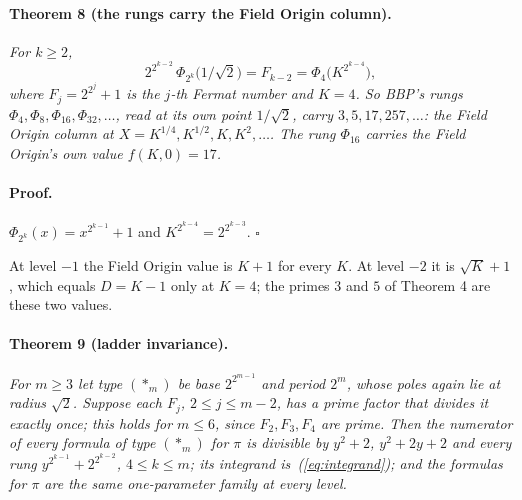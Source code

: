 \documentclass[twocolumn]{iopjournal}
\begin{document}
\paragraph{Theorem 8 (the rungs carry the Field Origin column).}
\textit{For $k \ge 2$,}
\begin{equation}
  2^{2^{k-2}}\,\Phi_{2^k}\!\big(1/\sqrt2\big) = F_{k-2}
  = \Phi_4\big(K^{2^{k-4}}\big),
\end{equation}
\textit{where $F_j = 2^{2^j} + 1$ is the $j$-th Fermat number and
$K = 4$. So BBP's rungs $\Phi_4, \Phi_8, \Phi_{16}, \Phi_{32}, \dots$,
read at its own point $1/\sqrt2$, carry $3, 5, 17, 257, \dots$: the
Field Origin column at $X = K^{1/4}, K^{1/2}, K, K^2, \dots$. The rung
$\Phi_{16}$ carries the Field Origin's own value $f(K,0) = 17$.}

\paragraph{Proof.} $\Phi_{2^k}(x) = x^{2^{k-1}} + 1$ and
$K^{2^{k-4}} = 2^{2^{k-3}}$. \hfill $\square$

\medskip
\noindent
At level $-1$ the Field Origin value is $K + 1$ for every $K$. At
level $-2$ it is $\sqrt K + 1$, which equals $D = K - 1$ only at
$K = 4$; the primes $3$ and $5$ of Theorem 4 are these two values.

\paragraph{Theorem 9 (ladder invariance).} \textit{For $m \ge 3$ let
type $(\ast_m)$ be base $2^{2^{m-1}}$ and period $2^m$, whose poles
again lie at radius $\sqrt2$. Suppose each $F_j$, $2 \le j \le m-2$,
has a prime factor that divides it exactly once; this holds for
$m \le 6$, since $F_2, F_3, F_4$ are prime. Then the numerator of every
formula of type $(\ast_m)$ for $\pi$ is divisible by $y^2 + 2$,
$y^2 + 2y + 2$ and every rung $y^{2^{k-1}} + 2^{2^{k-2}}$,
$4 \le k \le m$; its integrand is~(\ref{eq:integrand}); and the
formulas for $\pi$ are the same one-parameter family at every level.}
\end{document}
